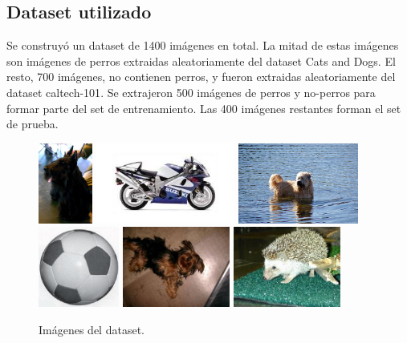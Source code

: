 \documentclass[12pt]{article}
\begin{document}
\subsection{Dataset utilizado}

Se construyó un dataset de 1400 imágenes en total. La mitad de estas imágenes
son imágenes de perros extraidas aleatoriamente del dataset Cats and Dogs\cite{parkhi12a}.  El
resto, 700 imágenes, no contienen perros, y fueron extraidas aleatoriamente del
dataset caltech-101\cite{caltech101}.  Se extrajeron 500 imágenes de perros y no-perros para
formar parte del set de entrenamiento.  Las 400 imágenes restantes forman el set
de prueba.

\begin{figure}[H]
    \centering
\includegraphics[height=100px]{../dogs/eval/20.jpg}
\includegraphics[height=100px]{../no-dogs/eval/43.jpg}
\includegraphics[height=100px]{../dogs/eval/134.jpg}
\includegraphics[height=100px]{../no-dogs/eval/167.jpg}
\includegraphics[height=100px]{../dogs/eval/78.jpg}
\includegraphics[height=100px]{../no-dogs/eval/145.jpg}
    \caption{Imágenes del dataset.}
\end{figure}
\end{document}
